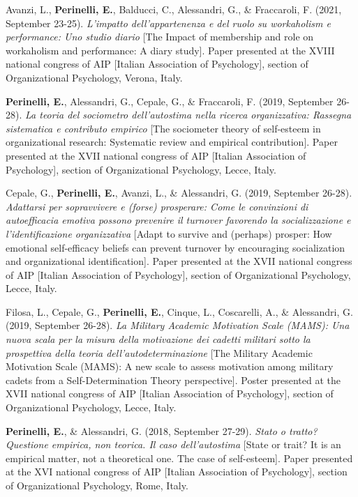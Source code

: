 \documentclass[hidelinks, letterpaper,10pt]{article} %
\begin{document}
\begin{etaremune}
    \item Avanzi, L., \textbf{Perinelli, E.}, Balducci, C., Alessandri, G., \& Fraccaroli, F. (2021, September 23-25). \textit{L’impatto dell'appartenenza e del ruolo su workaholism e performance: Uno studio diario} [The Impact of membership and role on workaholism and performance: A diary study]. Paper presented at the XVIII national congress of AIP [Italian Association of Psychology], section of Organizational Psychology, Verona, Italy.

    \item \textbf{Perinelli, E.}, Alessandri, G., Cepale, G., \& Fraccaroli, F. (2019, September 26-28). \textit{La teoria del sociometro dell’autostima nella ricerca organizzativa: Rassegna sistematica e contributo empirico} [The sociometer theory of self-esteem in organizational research: Systematic review and empirical contribution]. Paper presented at the XVII national congress of AIP [Italian Association of Psychology], section of Organizational Psychology, Lecce, Italy.

    \item Cepale, G., \textbf{Perinelli, E.}, Avanzi, L., \& Alessandri, G. (2019, September 26-28). \textit{Adattarsi per sopravvivere e (forse) prosperare: Come le convinzioni di autoefficacia emotiva possono prevenire il turnover favorendo la socializzazione e l’identificazione organizzativa} [Adapt to survive and (perhaps) prosper: How emotional self-efficacy beliefs can prevent turnover by encouraging socialization and organizational identification]. Paper presented at the XVII national congress of AIP [Italian Association of Psychology], section of Organizational Psychology, Lecce, Italy.

    \item Filosa, L., Cepale, G., \textbf{Perinelli, E.}, Cinque, L., Coscarelli, A., \& Alessandri, G. (2019, September 26-28). \textit{La Military Academic Motivation Scale (MAMS): Una nuova scala per la misura della motivazione dei cadetti militari sotto la prospettiva della teoria dell’autodeterminazione} [The Military Academic Motivation Scale (MAMS): A new scale to assess motivation among military cadets from a Self-Determination Theory perspective]. Poster presented at the XVII national congress of AIP [Italian Association of Psychology], section of Organizational Psychology, Lecce, Italy.

    \item \textbf{Perinelli, E.}, \& Alessandri, G. (2018, September 27-29). \textit{Stato o tratto? Questione empirica, non teorica. Il caso dell’autostima} [State or trait? It is an empirical matter, not a theoretical one. The case of self-esteem]. Paper presented at the XVI national congress of AIP [Italian Association of Psychology], section of Organizational Psychology, Rome, Italy.


\end{etaremune}
\end{document}
